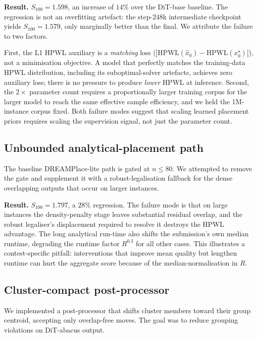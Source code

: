 \documentclass[nolineno]{ieeeaccess}
\begin{document}
\textbf{Result.} $S_{100}=1.598$, an increase of $14\%$ over the
DiT-base baseline. The regression is not an overfitting artefact: the
step-$248$k intermediate checkpoint yields $S_{100}=1.579$, only
marginally better than the final. We attribute the failure to two
factors.

First, the L1 HPWL auxiliary is a \emph{matching} loss
($|\text{HPWL}(\hat{x}_0) - \text{HPWL}(x_0^{\star})|$), not a minimisation
objective. A model that perfectly matches the training-data HPWL
distribution, including its suboptimal-solver artefacts, achieves zero
auxiliary loss; there is no pressure to produce \emph{lower} HPWL at
inference. Second, the $2\times$ parameter count requires a
proportionally larger training corpus for the larger model to reach
the same effective sample efficiency, and we held the 1M-instance
corpus fixed. Both failure modes suggest that scaling learned
placement priors requires scaling the supervision signal, not just
the parameter count.

\subsection{Unbounded analytical-placement path}
\label{sec:ablation-unbounded-dp}
The baseline DREAMPlace-lite path is gated at $n\le 80$. We attempted
to remove the gate and supplement it with a robust-legalisation
fallback for the dense overlapping outputs that occur on larger
instances.

\textbf{Result.} $S_{100}=1.797$, a $28\%$ regression. The failure
mode is that on large instances the density-penalty stage leaves
substantial residual overlap, and the robust legaliser's displacement
required to resolve it destroys the HPWL advantage. The long
analytical run-time also shifts the submission's own median runtime,
degrading the runtime factor $R^{0.3}$ for all other cases. This
illustrates a contest-specific pitfall: interventions that improve
mean quality but lengthen runtime can hurt the aggregate score
because of the median-normalisation in $R$.

\subsection{Cluster-compact post-processor}
\label{sec:ablation-cluster-compact}
We implemented a post-processor that shifts cluster members toward
their group centroid, accepting only overlap-free moves. The goal was
to reduce grouping violations on DiT-abacus output.
\end{document}
